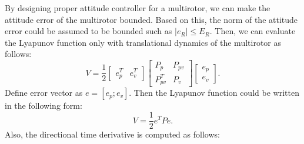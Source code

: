\documentclass{article}
\begin{document}
\newpage
By designing proper attitude controller for a multirotor, we can make the attitude error of the multirotor bounded.
Based on this, the norm of the attitude error could be assumed to be bounded such as $|e_R| \leq E_R$.
Then, we can evaluate the Lyapunov function only with translational dynamics of the multirotor as follows:
\begin{equation}
    V = \frac{1}{2} \left[
        \begin{array}{cc}
        e_p^T & e_v^T
        \end{array}
        \right] 
        \left[
        \begin{array}{cc}
		P_p & P_{pv} \\ P_{pv}^T & P_v
        \end{array}
        \right]
		\left[
		\begin{array}{c}
		e_p \\ e_v
		\end{array}
		\right]. \nonumber
\end{equation}
Define error vector as $e = [e_p;e_v]$. Then the Lyapunov function could be written in the following form:
\begin{equation}
V=\frac{1}{2}e^TPe. \nonumber
\end{equation}
Also, the directional time derivative is computed as follows:
\end{document}
